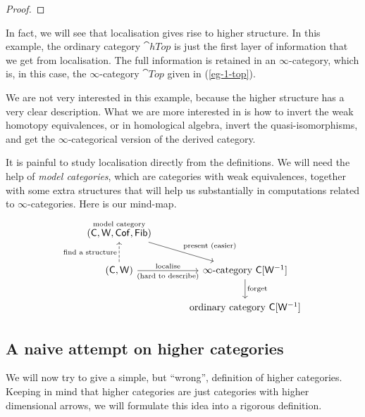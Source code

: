 \begin{proof}
    \nyw
\end{proof}

In fact, we will see that localisation gives rise to higher structure.
In this example, the ordinary category $\cat{hTop}$
is just the first layer of information that we get from localisation.
The full information is retained in an $\infty$-category,
which is, in this case, the $\infty$-category $\cat{Top}$ 
given in (\ref{eg-1-top}).

We are not very interested in this example,
because the higher structure has a very clear description.
What we are more interested in is how to
invert the weak homotopy equivalences,
or in homological algebra,
invert the quasi-isomorphisms,
and get the $\infty$-categorical version of the derived category.

It is painful to study localisation directly from the definitions.
We will need the help of \emph{model categories},
which are categories with weak equivalences,
together with some extra structures
that will help us substantially in computations related to $\infty$-categories.
Here is our mind-map.
\[ \begin{tikzcd}[column sep=3em,row sep=2em]
    \overset{\text{model category}}{(\cat C,\cat W,\cat{Cof},\cat{Fib})} \ar[dr,"\text{present }(\text{easier})"] \\
    (\cat C,\cat W) \ar[u,dashed,"\text{find a structure}"] \ar[r,"\text{localise}","(\text{hard to describe})"']
    & \infty\text{-category }\cat C[\cat W^{-1}] \ar[d,"\text{forget}"] \\
    & \text{ordinary category }\cat C[\cat W^{-1}]
\end{tikzcd} \]

\subsection{A naive attempt on higher categories}

We will now try to give a simple, but ``wrong'',
definition of higher categories.
Keeping in mind that higher categories
are just categories with higher dimensional arrows,
we will formulate this idea into a rigorous definition.

